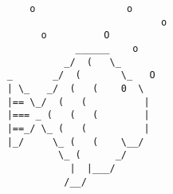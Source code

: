 
\begin{verbatim}
        o                o         
                               o     
          o          O            
                ______    o      
              _/  (   \_        
    _       _/  (       \_   O      
    | \_   _/  (   (    0  \        
    |== \_/  (   (          |      
    |=== _ (   (   (        |       
    |==_/ \_ (   (          |     
    |_/     \_ (   (    \__/    
             \_ (      _/         
               |  |___/          
              /__/               
\end{verbatim}
    